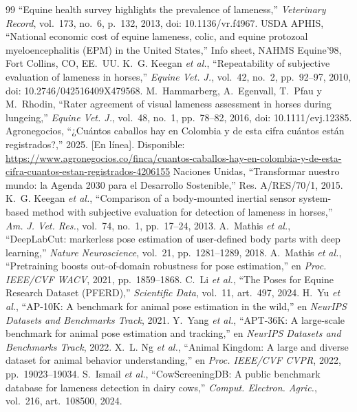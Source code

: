 \documentclass[conference,a4paper]{IEEEtran}
\begin{document}
\begin{thebibliography}{99}
 ``Equine health survey highlights the prevalence of lameness,'' \emph{Veterinary Record}, vol.~173, no.~6, p.~132, 2013, doi: 10.1136/vr.f4967.
 USDA APHIS, ``National economic cost of equine lameness, colic, and equine protozoal myeloencephalitis (EPM) in the United States,'' Info sheet, NAHMS Equine'98, Fort Collins, CO, EE.~UU.
 K.~G. Keegan \emph{et al.}, ``Repeatability of subjective evaluation of lameness in horses,'' \emph{Equine Vet. J.}, vol.~42, no.~2, pp.~92--97, 2010, doi: 10.2746/042516409X479568.
 M.~Hammarberg, A.~Egenvall, T.~Pfau y M.~Rhodin, ``Rater agreement of visual lameness assessment in horses during lungeing,'' \emph{Equine Vet. J.}, vol.~48, no.~1, pp.~78--82, 2016, doi: 10.1111/evj.12385.
 Agronegocios, ``¿Cuántos caballos hay en Colombia y de esta cifra cuántos están registrados?,'' 2025. [En línea]. Disponible: \url{https://www.agronegocios.co/finca/cuantos-caballos-hay-en-colombia-y-de-esta-cifra-cuantos-estan-registrados-4206155}
 Naciones Unidas, ``Transformar nuestro mundo: la Agenda 2030 para el Desarrollo Sostenible,'' Res. A/RES/70/1, 2015.
 K.~G. Keegan \emph{et al.}, ``Comparison of a body-mounted inertial sensor system-based method with subjective evaluation for detection of lameness in horses,'' \emph{Am. J. Vet. Res.}, vol.~74, no.~1, pp.~17--24, 2013.
 A.~Mathis \emph{et al.}, ``DeepLabCut: markerless pose estimation of user-defined body parts with deep learning,'' \emph{Nature Neuroscience}, vol.~21, pp.~1281--1289, 2018.
 A.~Mathis \emph{et al.}, ``Pretraining boosts out-of-domain robustness for pose estimation,'' en \emph{Proc. IEEE/CVF WACV}, 2021, pp.~1859--1868.
 C.~Li \emph{et al.}, ``The Poses for Equine Research Dataset (PFERD),'' \emph{Scientific Data}, vol.~11, art.~497, 2024.
 H.~Yu \emph{et al.}, ``AP-10K: A benchmark for animal pose estimation in the wild,'' en \emph{NeurIPS Datasets and Benchmarks Track}, 2021.
 Y.~Yang \emph{et al.}, ``APT-36K: A large-scale benchmark for animal pose estimation and tracking,'' en \emph{NeurIPS Datasets and Benchmarks Track}, 2022.
 X.~L. Ng \emph{et al.}, ``Animal Kingdom: A large and diverse dataset for animal behavior understanding,'' en \emph{Proc. IEEE/CVF CVPR}, 2022, pp.~19023--19034.
 S.~Ismail \emph{et al.}, ``CowScreeningDB: A public benchmark database for lameness detection in dairy cows,'' \emph{Comput. Electron. Agric.}, vol.~216, art.~108500, 2024.

\end{thebibliography}
\end{document}
